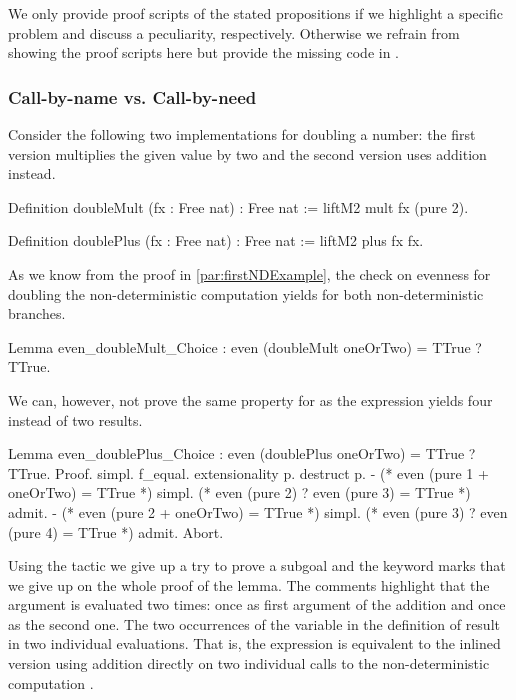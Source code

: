 We only provide proof scripts of the stated propositions if we highlight a specific problem and discuss a peculiarity, respectively.
Otherwise we refrain from showing the proof scripts here but provide the missing code in .

\subsubsection{Call\--by\--name vs. Call\--by\--need}
\label{subsubsec:cbneed}
 
Consider the following two implementations for doubling a number: the first version multiplies the given value by two and the second version uses addition instead.

\begin{coqcode}
Definition doubleMult (fx : Free nat) : Free nat :=
  liftM2 mult fx (pure 2).

Definition doublePlus (fx : Free nat) : Free nat :=
  liftM2 plus fx fx.
\end{coqcode}

As we know from the proof in \autoref{par:firstNDExample}, the check on evenness for doubling the non\--deterministic computation  yields  for both non\--deterministic branches.

\begin{coqcode}
Lemma even_doubleMult_Choice :
  even (doubleMult oneOrTwo) = TTrue ? TTrue.
\end{coqcode}

We can, however, not prove the same property for  as the expression yields four instead of two results.

\begin{coqcode}
Lemma even_doublePlus_Choice :
 even (doublePlus oneOrTwo) = TTrue ? TTrue.
Proof.
  simpl. f_equal. extensionality p.
  destruct p.
  - (* even (pure 1 + oneOrTwo) = TTrue *)
    simpl.
    (* even (pure 2) ? even (pure 3) = TTrue *)
    admit.
  - (* even (pure 2 + oneOrTwo) = TTrue *)
    simpl.
    (* even (pure 3) ? even (pure 4) = TTrue *)
    admit.
Abort.
\end{coqcode}

Using the tactic  we give up a try to prove a subgoal and the keyword  marks that we give up on the whole proof of the lemma.
The comments highlight that the argument  is evaluated two times: once as first argument of the addition and once as the second one.
The two occurrences of the variable  in the definition of  result in two individual evaluations.
That is, the expression is equivalent to the inlined version using addition directly on two individual calls to the non\--deterministic computation .

